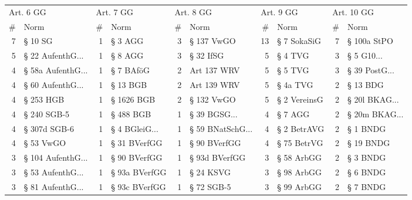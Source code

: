 \vspace{3mm}
\begin{tabular}{rlrlrlrlrl}
\toprule
\multicolumn{2}{l}{Art. 6 GG} & \multicolumn{2}{l}{Art. 7 GG} & \multicolumn{2}{l}{Art. 8 GG} & \multicolumn{2}{l}{Art. 9 GG} & \multicolumn{2}{l}{Art. 10 GG} \\
        \# &                 Norm &         \# &            Norm &         \# &               Norm &         \# &           Norm &          \# &            Norm \\
\midrule
        7 &              § 10 SG &         1 &         § 3 AGG &         3 &         § 137 VwGO &        13 &    § 7 SokaSiG &          7 &     § 100a StPO \\
        5 &   § 22 AufenthG... &         1 &         § 8 AGG &         3 &          § 32 IfSG &         5 &        § 4 TVG &          3 &    § 5 G10... \\
        4 &  § 58a AufenthG... &         1 &       § 7 BAföG &         2 &        Art 137 WRV &         5 &        § 5 TVG &          3 & § 39 PostG... \\
        4 &   § 60 AufenthG... &         1 &        § 13 BGB &         2 &        Art 139 WRV &         5 &       § 4a TVG &          2 &        § 13 BDG \\
        4 &            § 253 HGB &         1 &      § 1626 BGB &         2 &         § 132 VwGO &         5 &   § 2 VereinsG &          2 & § 20l BKAG... \\
        4 &          § 240 SGB-5 &         1 &       § 488 BGB &         1 &     § 39 BGSG... &         4 &        § 7 AGG &          2 & § 20m BKAG... \\
        4 &         § 307d SGB-6 &         1 & § 4 BGleiG... &         1 & § 59 BNatSchG... &         4 &    § 2 BetrAVG &          2 &        § 1 BNDG \\
        4 &            § 53 VwGO &         1 &    § 31 BVerfGG &         1 &       § 90 BVerfGG &         4 &    § 75 BetrVG &          2 &       § 19 BNDG \\
        3 &  § 104 AufenthG... &         1 &    § 90 BVerfGG &         1 &      § 93d BVerfGG &         3 &     § 58 ArbGG &          2 &        § 3 BNDG \\
        3 &   § 53 AufenthG... &         1 &   § 93a BVerfGG &         1 &          § 24 KSVG &         3 &     § 98 ArbGG &          2 &        § 6 BNDG \\
        3 &   § 81 AufenthG... &         1 &   § 93c BVerfGG &         1 &         § 72 SGB-5 &         3 &     § 99 ArbGG &          2 &        § 7 BNDG \\

\end{tabular}
